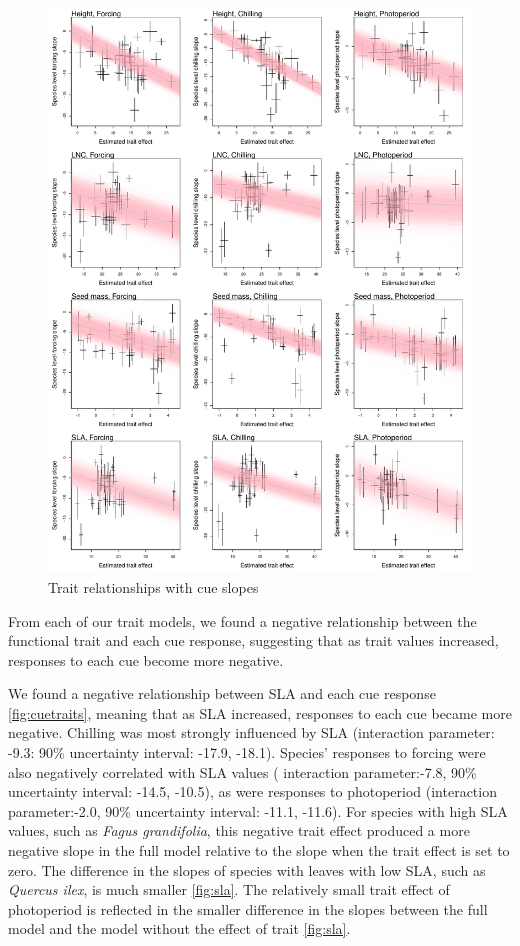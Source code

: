 \documentclass{article}\usepackage[]{graphicx}\usepackage[]{color}
\begin{document}
\begin{figure}[h!]
    \centering
 \includegraphics[width=\textwidth]{..//..//analyses/traits/figures/cuetrait_wtrend.pdf} 
    \caption{Trait relationships with cue slopes}
    \label{fig:cuetraits_wtrend}
\end{figure}

From each of our trait models, we found a negative relationship between the functional trait and each cue response, suggesting that as trait values increased, responses to each cue become more negative. 

We found a negative relationship between SLA and each cue response  \ref{fig:cuetraits}, meaning that as SLA increased, responses to each cue became more negative. Chilling was most strongly influenced by SLA (interaction parameter: -9.3: 90\% uncertainty interval: -17.9, -18.1). Species' responses to forcing were also negatively correlated with SLA values ( interaction parameter:-7.8, 90\% uncertainty interval: -14.5, -10.5), as were responses to photoperiod (interaction parameter:-2.0, 90\% uncertainty interval: -11.1, -11.6). For species with high SLA values, such as \textit{Fagus grandifolia}, this negative trait effect produced a more negative slope in the full model relative to the slope when the trait effect is set to zero. The difference in the slopes of species with leaves with low SLA, such as \textit{Quercus ilex}, is much smaller \ref{fig:sla}. The relatively small trait effect of photoperiod is reflected in the smaller difference in the slopes between the full model and the model without the effect of trait \ref{fig:sla}.
\end{document}
